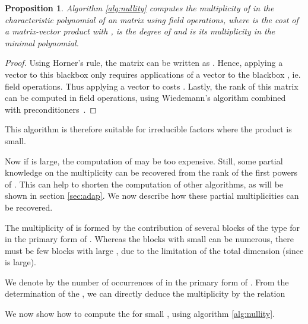 \documentclass{article}
\newtheorem{prop}[thm]{Proposition}
\begin{document}
\begin{prop}
Algorithm \ref{alg:nullity} computes the multiplicity of  in
the characteristic polynomial of an  matrix  using  
field operations, where  is the cost of a matrix-vector
product with ,  is the degree of  and  is its multiplicity
in the minimal polynomial.
\end{prop}
\begin{proof}
Using Horner's rule, the matrix  can be written as . Hence, applying a vector to this blackbox
only requires  applications of a vector to the blackbox ,
ie.  field operations.
Thus applying a vector to  costs .
Lastly, the rank of this matrix can be
computed in  field operations, using 
Wiedemann's algorithm combined with preconditioners~\cite{jgd:2002:villard}.
\end{proof}
This algorithm is therefore suitable for irreducible factors  where the
product  is small.

Now if  is large, the computation of  may be too
 expensive. Still, some partial knowledge on the multiplicity can be
recovered from the rank of the first powers of . This can help to shorten
the computation of other algorithms, as will be shown in section \ref{sec:adap}.
We now describe how these partial multiplicities can be recovered.

The multiplicity  of  is formed by the contribution of several blocks of the 
type  for  in the primary form of .
Whereas the blocks with small  can be numerous, there must be few  blocks
with large , due to the limitation of the total dimension (since  is
large). 

We denote by  the number of occurrences of  in the
primary form of . From the determination of the , we can
directly deduce the multiplicity  by the relation 

We now show how to compute the  for
small , using algorithm \ref{alg:nullity}. 
\end{document}
